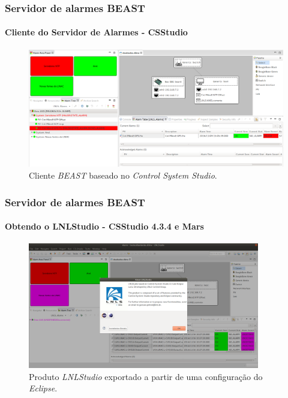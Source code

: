 \begin{frame}
\frametitle{Servidor de alarmes BEAST}
\framesubtitle{Cliente do Servidor de Alarmes - CSStudio}
\begin{figure}[h]
\centering
\includegraphics[width=\textwidth]{image/beast-screen-shot}
\caption {Cliente \textit{BEAST} baseado no \textit{Control System Studio}.}
\label{fig:alarm}
\end{figure}

\end{frame}


\begin{frame}
\frametitle{Servidor de alarmes BEAST}
\framesubtitle{Obtendo o LNLStudio - CSStudio 4.3.4 e Mars}
\begin{figure}[h]
\centering
\includegraphics[width=0.90\textwidth]{image/lnlstudio}
\caption {\centering Produto \textit{LNLStudio} exportado a partir de uma
configuração do \textit{Eclipse}.}
\label{fig:lnlstudio}
\end{figure}

\end{frame}
